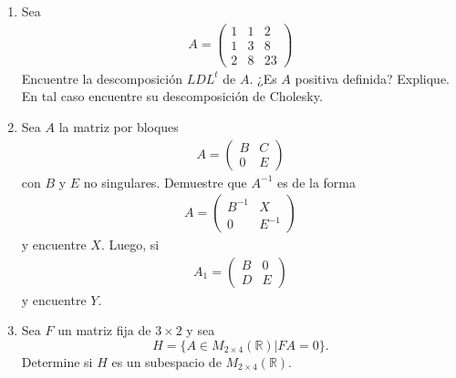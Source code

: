 \documentclass[11pt,letterpaper]{article}
\begin{document}
\begin{enumerate}
\item Sea 
\begin{align*}
A=\begin{pmatrix}
1 & 1 & 2 \\
1 & 3 & 8\\
2 & 8 & 23
\end{pmatrix}
\end{align*}
Encuentre la descomposición $LDL^t$ de $A$. ¿Es $A$ positiva definida? Explique. En tal caso encuentre su descomposición de Cholesky.

\item Sea $A$ la matriz por bloques
\begin{align*}
A=\begin{pmatrix}
B & C \\
0 & E
\end{pmatrix}
\end{align*}
con $B$ y $E$ no singulares. Demuestre que $A^{-1}$ es de la forma
\begin{align*}
A=\begin{pmatrix}
B^{-1}& X \\
0 & E^{-1}
\end{pmatrix}
\end{align*}
y encuentre $X$. Luego, si 
\begin{align*}
A_1=\begin{pmatrix}
B & 0 \\
D & E
\end{pmatrix}
\end{align*}
y encuentre $Y$.

\item Sea $F$ un matriz fija de $3\times 2$ y sea $$H=\{A\in M_{2\times 4}(\mathbb{R})|FA=0\}.$$
Determine si $H$ es un subespacio de $M_{2\times 4}(\mathbb{R})$.


\end{enumerate}
\end{document}
